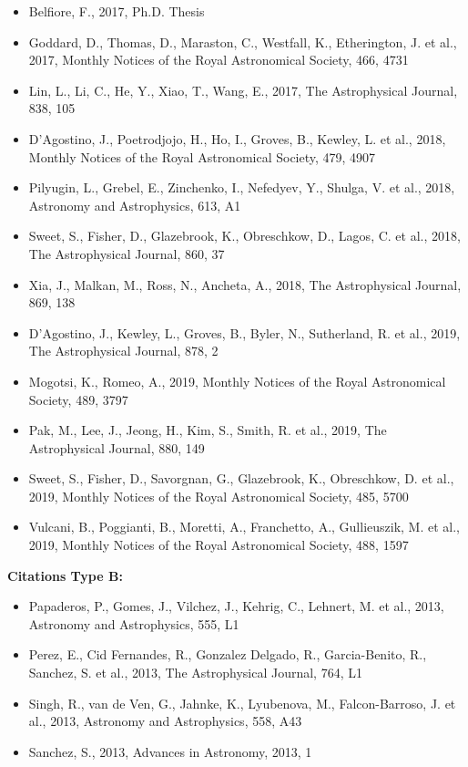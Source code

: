 \documentclass{letter}
\begin{document}
\begin{enumerate}
\begin{itemize}
\item Belfiore, F., 2017, Ph.D. Thesis
\item Goddard, D., Thomas, D., Maraston, C., Westfall, K., Etherington, J. et al., 2017, Monthly Notices of the Royal Astronomical Society, 466, 4731
\item Lin, L., Li, C., He, Y., Xiao, T., Wang, E., 2017, The Astrophysical Journal, 838, 105
\item D'Agostino, J., Poetrodjojo, H., Ho, I., Groves, B., Kewley, L. et al., 2018, Monthly Notices of the Royal Astronomical Society, 479, 4907
\item Pilyugin, L., Grebel, E., Zinchenko, I., Nefedyev, Y., Shulga, V. et al., 2018, Astronomy and Astrophysics, 613, A1
\item Sweet, S., Fisher, D., Glazebrook, K., Obreschkow, D., Lagos, C. et al., 2018, The Astrophysical Journal, 860, 37
\item Xia, J., Malkan, M., Ross, N., Ancheta, A., 2018, The Astrophysical Journal, 869, 138
\item D'Agostino, J., Kewley, L., Groves, B., Byler, N., Sutherland, R. et al., 2019, The Astrophysical Journal, 878, 2
\item Mogotsi, K., Romeo, A., 2019, Monthly Notices of the Royal Astronomical Society, 489, 3797
\item Pak, M., Lee, J., Jeong, H., Kim, S., Smith, R. et al., 2019, The Astrophysical Journal, 880, 149
\item Sweet, S., Fisher, D., Savorgnan, G., Glazebrook, K., Obreschkow, D. et al., 2019, Monthly Notices of the Royal Astronomical Society, 485, 5700
\item Vulcani, B., Poggianti, B., Moretti, A., Franchetto, A., Gullieuszik, M. et al., 2019, Monthly Notices of the Royal Astronomical Society, 488, 1597
\end{itemize}
{\bf Citations Type B:}
\begin{itemize}
\item Papaderos, P., Gomes, J., Vilchez, J., Kehrig, C., Lehnert, M. et al., 2013, Astronomy and Astrophysics, 555, L1
\item Perez, E., Cid Fernandes, R., Gonzalez Delgado, R., Garcia-Benito, R., Sanchez, S. et al., 2013, The Astrophysical Journal, 764, L1
\item Singh, R., van de Ven, G., Jahnke, K., Lyubenova, M., Falcon-Barroso, J. et al., 2013, Astronomy and Astrophysics, 558, A43
\item Sanchez, S., 2013, Advances in Astronomy, 2013, 1

\end{itemize}
\end{enumerate}
\end{document}
